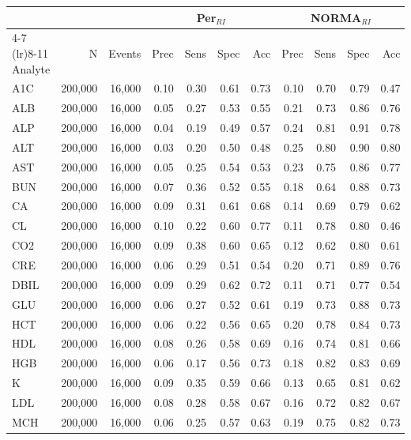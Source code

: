 \begin{table}[ht]
\centering
\footnotesize
\begin{tabular}{lrrrrrrrrrr}
\toprule
 & &  & \multicolumn{4}{c}{Per$_{RI}$} & \multicolumn{4}{c}{NORMA$_{RI}$} \\
\cmidrule(lr){4-7} \cmidrule(lr){8-11}
Analyte & N & Events & Prec & Sens & Spec & Acc & Prec & Sens & Spec & Acc \\
\midrule
A1C & 200,000 & 16,000 & 0.10 & 0.30 & 0.61 & 0.73 & 0.10 & 0.70 & 0.79 & 0.47 \\
ALB & 200,000 & 16,000 & 0.05 & 0.27 & 0.53 & 0.55 & 0.21 & 0.73 & 0.86 & 0.76 \\
ALP & 200,000 & 16,000 & 0.04 & 0.19 & 0.49 & 0.57 & 0.24 & 0.81 & 0.91 & 0.78 \\
ALT & 200,000 & 16,000 & 0.03 & 0.20 & 0.50 & 0.48 & 0.25 & 0.80 & 0.90 & 0.80 \\
AST & 200,000 & 16,000 & 0.05 & 0.25 & 0.54 & 0.53 & 0.23 & 0.75 & 0.86 & 0.77 \\
BUN & 200,000 & 16,000 & 0.07 & 0.36 & 0.52 & 0.55 & 0.18 & 0.64 & 0.88 & 0.73 \\
CA & 200,000 & 16,000 & 0.09 & 0.31 & 0.61 & 0.68 & 0.14 & 0.69 & 0.79 & 0.62 \\
CL & 200,000 & 16,000 & 0.10 & 0.22 & 0.60 & 0.77 & 0.11 & 0.78 & 0.80 & 0.46 \\
CO2 & 200,000 & 16,000 & 0.09 & 0.38 & 0.60 & 0.65 & 0.12 & 0.62 & 0.80 & 0.61 \\
CRE & 200,000 & 16,000 & 0.06 & 0.29 & 0.51 & 0.54 & 0.20 & 0.71 & 0.89 & 0.76 \\
DBIL & 200,000 & 16,000 & 0.09 & 0.29 & 0.62 & 0.72 & 0.11 & 0.71 & 0.77 & 0.54 \\
GLU & 200,000 & 16,000 & 0.06 & 0.27 & 0.52 & 0.61 & 0.19 & 0.73 & 0.88 & 0.73 \\
HCT & 200,000 & 16,000 & 0.06 & 0.22 & 0.56 & 0.65 & 0.20 & 0.78 & 0.84 & 0.73 \\
HDL & 200,000 & 16,000 & 0.08 & 0.26 & 0.58 & 0.69 & 0.16 & 0.74 & 0.81 & 0.66 \\
HGB & 200,000 & 16,000 & 0.06 & 0.17 & 0.56 & 0.73 & 0.18 & 0.82 & 0.83 & 0.69 \\
K & 200,000 & 16,000 & 0.09 & 0.35 & 0.59 & 0.66 & 0.13 & 0.65 & 0.81 & 0.62 \\
LDL & 200,000 & 16,000 & 0.08 & 0.28 & 0.58 & 0.67 & 0.16 & 0.72 & 0.82 & 0.67 \\
MCH & 200,000 & 16,000 & 0.06 & 0.25 & 0.57 & 0.63 & 0.19 & 0.75 & 0.82 & 0.73 \\

\end{tabular}
\end{table}
